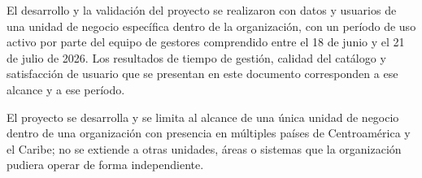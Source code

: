 El desarrollo y la validación del proyecto se realizaron con datos y usuarios de una unidad de negocio específica dentro de la organización, con un período de uso activo por parte del equipo de gestores comprendido entre el 18 de junio y el 21 de julio de 2026. Los resultados de tiempo de gestión, calidad del catálogo y satisfacción de usuario que se presentan en este documento corresponden a ese alcance y a ese período.

El proyecto se desarrolla y se limita al alcance de una única unidad de negocio dentro de una organización con presencia en múltiples países de Centroamérica y el Caribe; no se extiende a otras unidades, áreas o sistemas que la organización pudiera operar de forma independiente.
